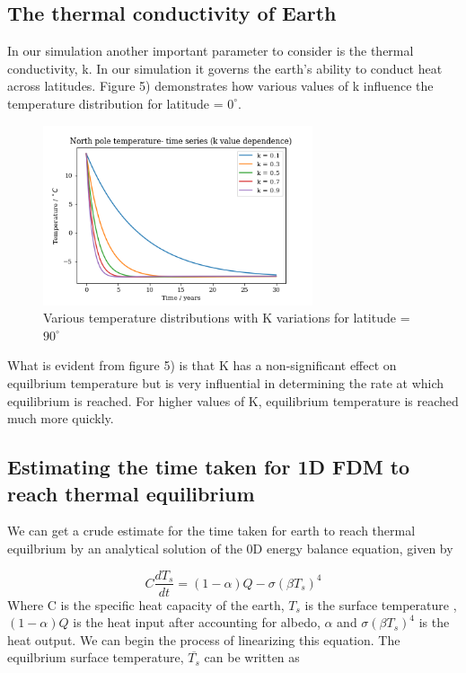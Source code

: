 \documentclass{article}%
\begin{document}
\subsection{The thermal conductivity of Earth}
In our simulation another important parameter to consider is the thermal conductivity, k. 
In our simulation it governs the earth's ability to conduct heat across latitudes.
Figure 5) demonstrates how various values of k influence the temperature distribution for latitude = $0^\circ$.

\begin{figure}[H]%
    \centering
    \includegraphics[width=300px]{north-pole-k-variation.png}
    \caption{Various temperature distributions with K variations for latitude = $90 ^\circ $}
\end{figure}

What is evident from figure 5) is that K has a non-significant effect on equilbrium temperature but is very influential in 
determining the rate at which equilibrium is reached. For higher values of K, equilibrium temperature is reached much more quickly.

\subsection{Estimating the time taken for 1D FDM to reach thermal equilibrium}
We can get a crude estimate for the time taken for earth to reach thermal equilbrium by an analytical solution of the 0D energy balance equation, given by \cite{Rose}

\begin{equation}
  C \frac{dT_{s}}{dt} = (1 - \alpha)Q - \sigma(\beta T_{s})^4 
\end{equation}
Where C is the specific heat capacity of the earth, $T_{s}$ is the surface temperature ,$ (1 - \alpha)Q $ is the heat input after accounting for albedo, $\alpha$ and $\sigma(\beta T_{s})^4$ is the heat output.
We can begin the process of linearizing this equation. 
The equilbrium surface temperature, $ \overline{T_{s}}$ can be written as
\end{document}
